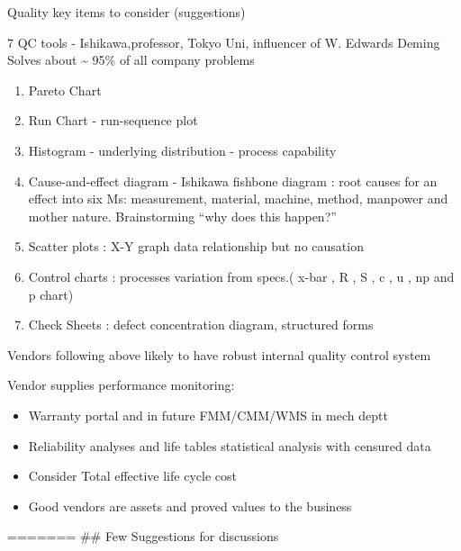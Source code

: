 \documentclass[
  10pt,
  ignorenonframetext,
  aspectratio=43,
]{beamer}
\providecommand{\tightlist}{%
  \setlength{\itemsep}{0pt}\setlength{\parskip}{0pt}}
\begin{document}
\begin{frame}{Quality key items to consider (suggestions)}
\protect\hypertarget{quality-key-items-to-consider-suggestions}{}
\begin{block}{7 QC tools - Ishikawa,professor, Tokyo Uni, influencer of
W. Edwards Deming}
\protect\hypertarget{qc-tools---ishikawaprofessor-tokyo-uni-influencer-of-w.-edwards-deming}{}
Solves about \textasciitilde{} 95\% of all company problems

\begin{enumerate}
\tightlist
\item
  Pareto Chart
\item
  Run Chart - run-sequence plot
\item
  Histogram - underlying distribution - process capability
\item
  Cause-and-effect diagram - Ishikawa fishbone diagram : root causes for
  an effect into six Ms: measurement, material, machine, method,
  manpower and mother nature. Brainstorming ``why does this happen?''
\item
  Scatter plots : X-Y graph data relationship but no causation
\item
  Control charts : processes variation from specs.( x-bar , R , S , c ,
  u , np and p chart)
\item
  Check Sheets : defect concentration diagram, structured forms
\end{enumerate}

Vendors following above likely to have robust internal quality control
system
\end{block}

\begin{block}{Vendor supplies performance monitoring:}
\protect\hypertarget{vendor-supplies-performance-monitoring}{}
\begin{itemize}
\tightlist
\item
  Warranty portal and in future FMM/CMM/WMS in mech deptt
\item
  Reliability analyses and life tables statistical analysis with
  censured data
\item
  Consider Total effective life cycle cost
\item
  Good vendors are assets and proved values to the business
\end{itemize}

======= \#\# Few Suggestions for discussions
\end{block}


\end{frame}
\end{document}
